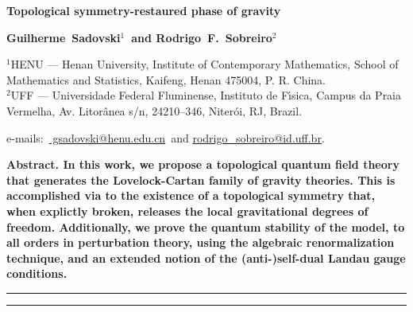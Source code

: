 \documentclass[main.tex]{subfiles}
\begin{document}
\thispagestyle{empty}
{
\noindent
\Large
\bfseries
Topological symmetry-restaured phase of gravity
\bigskip
\bigskip
}

{
\noindent
\bfseries
Guilherme~Sadovski${}^{1}${\normalfont~and}
Rodrigo~F.~Sobreiro${}^{2}$
\bigskip
}

{
\noindent
\footnotesize
${}^{1}$HENU --- Henan University, Institute of Contemporary Mathematics, School of Mathematics and Statistics, Kaifeng, Henan 475004, P. R. China. \\
${}^{2}$UFF --- Universidade Federal Fluminense, Instituto de F{\'{\i}}sica, Campus da Praia Vermelha, Av. Litor{\^{a}}nea s/n, 24210--346, Niter{\'{o}}i, RJ, Brazil.
\bigskip
\bigskip
}

{
\noindent
\footnotesize
\rmfamily
e-mails:~\href{
  mailto:gsadovski@henu.edu.cn}{
  gsadovski@henu.edu.cn}{\normalfont~and}
\href{
  mailto:rodrigo\_sobreiro@id.uff.br
}{
  rodrigo\_sobreiro@id.uff.br}{\normalfont.}
\bigskip
}

{
\noindent
\bfseries
Abstract.
\normalfont{}
In this work, we propose a topological quantum field theory that generates the Lovelock-Cartan family of gravity theories. This is accomplished via to the existence of a topological symmetry that, when explictly broken, releases the local gravitational degrees of freedom. Additionally, we prove the quantum stability of the model, to all orders in perturbation theory, using the algebraic renormalization technique, and an extended notion of the (anti-)self-dual Landau gauge conditions.
\bigskip
}

{
\noindent
\rule{\textwidth}{1pt}
\tableofcontents
\smallskip
\noindent
\rule{\linewidth}{1pt}
}
\end{document}
